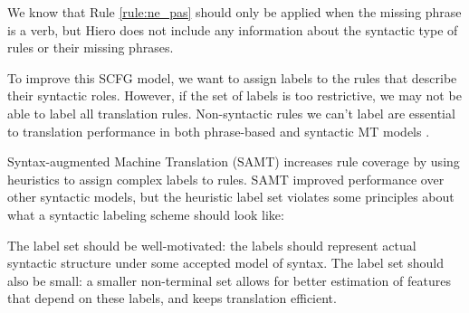 \documentclass[a4paper]{article}
\begin{document}
We know that Rule \ref{rule:ne_pas} should only be applied when the missing phrase is a verb, but Hiero does not include any information about the syntactic type of rules or their missing phrases.

To improve this SCFG model, we want to assign labels to the rules that describe their syntactic roles. However, if the set of labels is too restrictive, we may not be able to label all translation rules. Non-syntactic rules we can't label are essential to translation performance in both phrase-based \cite{koehn-och-marcu-2003} and syntactic MT models \cite{deneefe-syntax-and-phrase-mt}.


Syntax-augmented Machine Translation (SAMT) \cite{samt-wmt06} increases rule coverage by using heuristics to assign complex labels to rules. %
SAMT improved performance over other syntactic models, but the heuristic label set violates some principles about what a syntactic labeling scheme should look like:

The label set should be well-motivated: the labels should represent actual syntactic structure under some accepted model of syntax. The label set should also be small: a smaller non-terminal set allows for better estimation of features that depend on these labels, and keeps translation efficient. 
%
\end{document}
